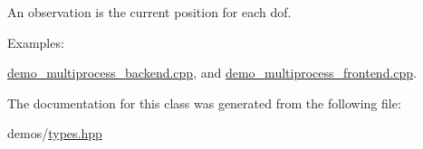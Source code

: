 An observation is the current position for each dof. \begin{Desc}
\item[Examples\+: ]\par
\hyperlink{demo_multiprocess_backend_8cpp-example}{demo\+\_\+multiprocess\+\_\+backend.\+cpp}, and \hyperlink{demo_multiprocess_frontend_8cpp-example}{demo\+\_\+multiprocess\+\_\+frontend.\+cpp}.\end{Desc}


The documentation for this class was generated from the following file\+:\begin{DoxyCompactItemize}
\item 
demos/\hyperlink{demos_2types_8hpp}{types.\+hpp}\end{DoxyCompactItemize}
